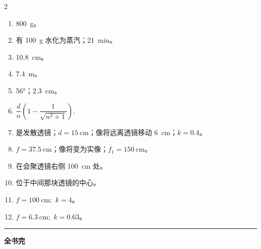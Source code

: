 \begin{fullwidth}
\begin{multicols}{2}
\begin{enumerate}[label=\arabic*.]
\item \SI{800}{\gram}。
\item 有 \SI{100}{\gram} 水化为蒸汽；\SI{21}{\minute}。
\item \SI{10.8}{\centi\metre}。
\item \SI{7.4}{\metre}。
\item \ang{56}；\SI{2.3}{\centi\metre}。
\item $\dfrac{d}{n} \left( 1 - \dfrac{1}{\sqrt{n^{2}+1}}\right).$
\item 是发散透镜；$d= \SI{15}{\centi\metre}$；像将远离透镜移动 \SI{6}{\centi\metre}；$k = 0.4$。
\item $f = \SI{37.5}{\centi\metre}$；像将变为实像；$f_{1} = \SI{150}{\centi\metre}$。
\item 在会聚透镜右侧 \SI{100}{\centi\metre} 处。
\item 位于中间那块透镜的中心。
\item $f=\SI{100}{\centi\metre}; \,\, k=4$。
\item $f = \SI{6.3}{\centi\metre}; \,\,k = 0.63$。
\end{enumerate}
\end{multicols}
\rule{14cm}{1pt}
\vspace{2cm}
\begin{center}
{\Huge\bfseries 全书完}
\end{center}


\end{fullwidth}

\cleardoublepage

